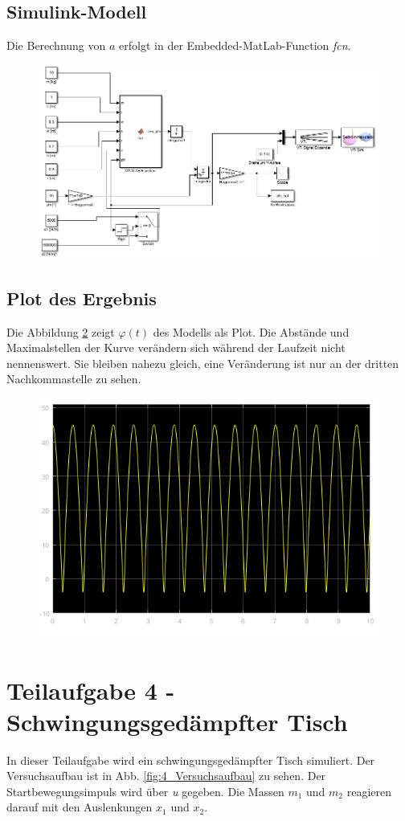 \documentclass[]{scrartcl}
\begin{document}
\subsection{Simulink-Modell}
Die Berechnung von $a$ erfolgt in der Embedded-MatLab-Function \textit{fcn}.

\begin{figure}[H]
\centering
\includegraphics[width=1\linewidth]{./3_Modell}
\caption{}
\label{fig:3_Modell}
\end{figure}

\subsection{Plot des Ergebnis}
Die Abbildung \ref{fig:3_Plot} zeigt $\varphi(t)$ des Modells als Plot. Die Abstände und Maximalstellen der Kurve verändern sich während der Laufzeit nicht nennenswert. Sie bleiben nahezu gleich, eine Veränderung ist nur an der dritten Nachkommastelle zu sehen.

\begin{figure}[H]
\centering
\includegraphics[width=0.5\linewidth]{./3_Plot}
\caption{}
\label{fig:3_Plot}
\end{figure}

\section{Teilaufgabe 4 - Schwingungsgedämpfter Tisch}
In dieser Teilaufgabe wird ein schwingungsgedämpfter Tisch simuliert. Der Versuchsaufbau ist in Abb. \ref{fig:4_Versuchsaufbau} zu sehen. Der Startbewegungsimpuls wird über \textit{u} gegeben. Die Massen $m_{1}$ und $m_{2}$ reagieren darauf mit den Auslenkungen $x_{1}$ und $x_{2}$.
\end{document}
